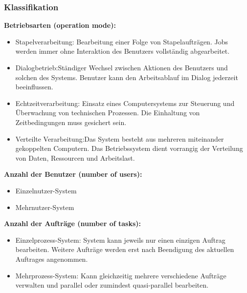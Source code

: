 \subsubsection{Klassifikation}
\textbf{Betriebsarten (operation mode):}
\begin{itemize}
    \item Stapelverarbeitung: Bearbeitung einer Folge von Stapelaufträgen. Jobs werden immer ohne Interaktion des Benutzers vollständig abgearbeitet.
    \item Dialogbetrieb:Ständiger Wechsel zwischen Aktionen des Benutzers und solchen des Systems. Benutzer kann den Arbeitsablauf im Dialog jederzeit beeinflussen.
    \item Echtzeitverarbeitung: Einsatz eines Computersystems zur Steuerung und Überwachung von technischen Prozessen. Die Einhaltung von Zeitbedingungen muss gesichert sein.
    \item Verteilte Verarbeitung:Das System besteht aus mehreren miteinander gekoppelten Computern. Das Betriebssystem dient vorrangig der Verteilung von Daten, Ressourcen und Arbeitslast.
\end{itemize}
\textbf{Anzahl der Benutzer (number of users):}
\begin{itemize}
    \item Einzelnutzer-System
    \item Mehrnutzer-System
\end{itemize}
\textbf{Anzahl der Aufträge (number of tasks):}
\begin{itemize}
    \item Einzelprozess-System: System kann jeweils nur einen einzigen Auftrag bearbeiten. Weitere Aufträge werden erst nach Beendigung des aktuellen Auftrages angenommen. 
    \item Mehrprozess-System: Kann gleichzeitig mehrere verschiedene Aufträge verwalten und parallel oder zumindest quasi-parallel bearbeiten.
\end{itemize}

